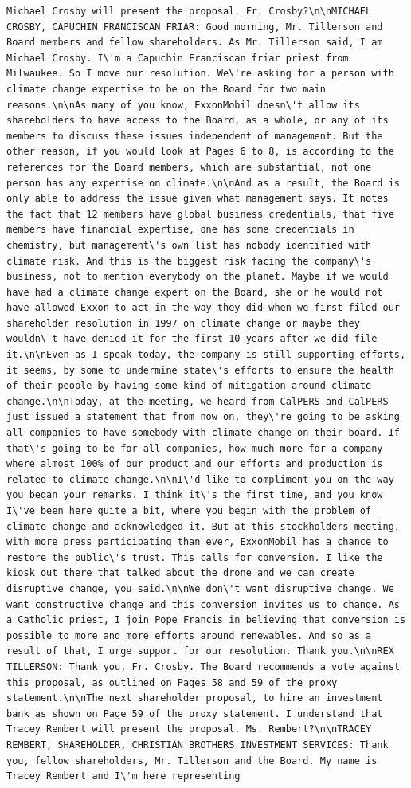 \documentclass[
  letterpaper,
  DIV=11,
  numbers=noendperiod]{scrreprt}
\begin{document}
\begin{verbatim}
Michael Crosby will present the proposal. Fr. Crosby?\n\nMICHAEL CROSBY, CAPUCHIN FRANCISCAN FRIAR: Good morning, Mr. Tillerson and Board members and fellow shareholders. As Mr. Tillerson said, I am Michael Crosby. I\'m a Capuchin Franciscan friar priest from Milwaukee. So I move our resolution. We\'re asking for a person with climate change expertise to be on the Board for two main reasons.\n\nAs many of you know, ExxonMobil doesn\'t allow its shareholders to have access to the Board, as a whole, or any of its members to discuss these issues independent of management. But the other reason, if you would look at Pages 6 to 8, is according to the references for the Board members, which are substantial, not one person has any expertise on climate.\n\nAnd as a result, the Board is only able to address the issue given what management says. It notes the fact that 12 members have global business credentials, that five members have financial expertise, one has some credentials in chemistry, but management\'s own list has nobody identified with climate risk. And this is the biggest risk facing the company\'s business, not to mention everybody on the planet. Maybe if we would have had a climate change expert on the Board, she or he would not have allowed Exxon to act in the way they did when we first filed our shareholder resolution in 1997 on climate change or maybe they wouldn\'t have denied it for the first 10 years after we did file it.\n\nEven as I speak today, the company is still supporting efforts, it seems, by some to undermine state\'s efforts to ensure the health of their people by having some kind of mitigation around climate change.\n\nToday, at the meeting, we heard from CalPERS and CalPERS just issued a statement that from now on, they\'re going to be asking all companies to have somebody with climate change on their board. If that\'s going to be for all companies, how much more for a company where almost 100% of our product and our efforts and production is related to climate change.\n\nI\'d like to compliment you on the way you began your remarks. I think it\'s the first time, and you know I\'ve been here quite a bit, where you begin with the problem of climate change and acknowledged it. But at this stockholders meeting, with more press participating than ever, ExxonMobil has a chance to restore the public\'s trust. This calls for conversion. I like the kiosk out there that talked about the drone and we can create disruptive change, you said.\n\nWe don\'t want disruptive change. We want constructive change and this conversion invites us to change. As a Catholic priest, I join Pope Francis in believing that conversion is possible to more and more efforts around renewables. And so as a result of that, I urge support for our resolution. Thank you.\n\nREX TILLERSON: Thank you, Fr. Crosby. The Board recommends a vote against this proposal, as outlined on Pages 58 and 59 of the proxy statement.\n\nThe next shareholder proposal, to hire an investment bank as shown on Page 59 of the proxy statement. I understand that Tracey Rembert will present the proposal. Ms. Rembert?\n\nTRACEY REMBERT, SHAREHOLDER, CHRISTIAN BROTHERS INVESTMENT SERVICES: Thank you, fellow shareholders, Mr. Tillerson and the Board. My name is Tracey Rembert and I\'m here representing 
\end{verbatim}
\end{document}

